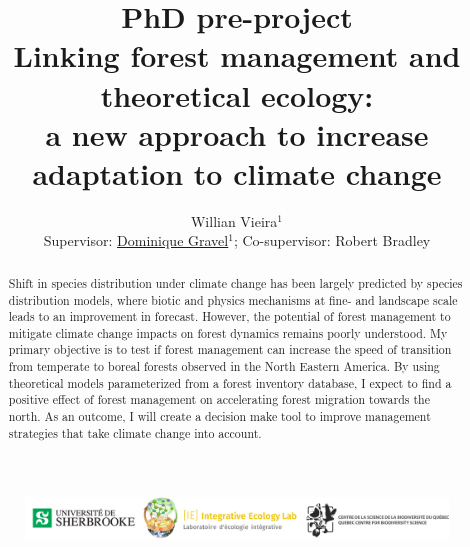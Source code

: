 


\title{
  PhD pre-project \\
  \bigskip
  Linking forest management and theoretical ecology: \\
  a new approach to increase adaptation to climate change
}

\author{Willian Vieira$^1$\\{\small Supervisor: \href{http://ielab.recherche.usherbrooke.ca}{Dominique Gravel}$^1$; Co-supervisor: Robert Bradley}}
\date{}



\maketitle

\begin{abstract}
Shift in species distribution under climate change has been largely predicted by species distribution models, where biotic and physics mechanisms at fine- and landscape scale leads to an improvement in forecast.
However, the potential of forest management to mitigate climate change impacts on forest dynamics remains poorly understood.
My primary objective is to test if forest management can increase the speed of transition from temperate to boreal forests observed in the North Eastern America.
By using theoretical models parameterized from a forest inventory database, I expect to find a positive effect of forest management on accelerating forest migration towards the north.
As an outcome, I will create a decision make tool to improve management strategies that take climate change into account.
\end{abstract}


\tableofcontents

\vfill
\begin{figure}
\centering\includegraphics[width=16cm]{img/logo.pdf}
\end{figure}
\thispagestyle{empty} %
\clearpage

